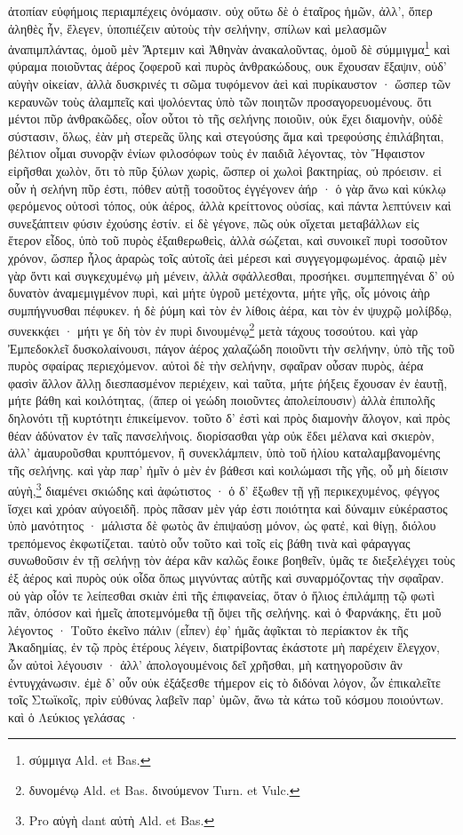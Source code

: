 \documentclass[a4paper, 11pt, oneside, polutonikogreek, german]{article}
\begin{document}
ἀτοπίαν εὐφήμοις περιαμπέχεις ὀνόμασιν. οὐχ οὕτω δὲ ὁ ἑταῖρος ἡμῶν, ἀλλ', ὅπερ ἀληθὲς ἦν, ἔλεγεν, ὑποπιέζειν αὐτοὺς τὴν σελήνην, σπίλων καὶ μελασμῶν ἀναπιμπλάντας, ὁμοῦ μὲν Ἄρτεμιν καὶ Ἀθηνὰν ἀνακαλοῦντας, ὁμοῦ δὲ σύμμιγμα\footnote{σύμμιγα Ald. et Bas.} καὶ φύραμα ποιοῦντας ἀέρος ζοφεροῦ καὶ πυρὸς ἀνθρακώδους, ουκ ἔχουσαν ἔξαψιν, οὐδ' αὐγὴν οἰκείαν, ἀλλὰ δυσκρινές τι σῶμα τυφόμενον ἀεὶ καὶ πυρίκαυστον · ὥσπερ τῶν κεραυνῶν τοὺς ἀλαμπεῖς καὶ ψολόεντας ὑπὸ τῶν ποιητῶν προσαγορευομένους. ὅτι μέντοι πῦρ ἀνθρακῶδες, οἷον οὗτοι τὸ τῆς σελήνης ποιοῦιν, οὐκ ἔχει διαμονὴν, οὐδὲ σύστασιν, ὅλως, ἐὰν μὴ στερεᾶς ὕλης καὶ στεγούσης ἅμα καὶ τρεφούσης ἐπιλάβηται, βέλτιον οἶμαι συνορᾷν ἐνίων φιλοσόφων τοὺς ἐν παιδιᾶ λέγοντας, τὸν Ἥφαιστον εἰρῆσθαι χωλὸν, ὅτι τὸ πῦρ ξύλων χωρὶς, ὥσπερ οἱ χωλοὶ βακτηρίας, οὐ πρόεισιν. εἰ οὖν ἡ σελήνη πῦρ ἐστι, πόθεν αὐτῇ τοσοῦτος ἐγγέγονεν ἀήρ · ὁ γὰρ ἄνω καὶ κύκλῳ φερόμενος οὑτοσὶ τόπος, οὐκ ἀέρος, ἀλλὰ κρείττονος οὐσίας, καὶ πάντα λεπτύνειν καὶ συνεξάπτειν φύσιν ἐχούσης ἐστίν. εἰ δὲ γέγονε, πῶς οὐκ οἴχεται μεταβάλλων εἰς ἕτερον εἶδος, ὑπὸ τοῦ πυρὸς ἐξαιθερωθεὶς, ἀλλὰ σώζεται, καὶ συνοικεῖ πυρὶ τοσοῦτον χρόνον, ὥσπερ ἧλος ἀραρὼς τοῖς αὐτοῖς ἀεὶ μέρεσι καὶ συγγεγομφωμένος. ἀραιῷ μὲν γὰρ ὄντι καὶ συγκεχυμένῳ μὴ μένειν, ἀλλὰ σφάλλεσθαι, προσήκει. συμπεπηγέναι δ' οὐ δυνατὸν ἀναμεμιγμένον πυρὶ, καὶ μήτε ὑγροῦ μετέχοντα, μήτε γῆς, οἷς μόνοις ἀὴρ συμπήγνυσθαι πέφυκεν. ἡ δὲ ῥύμη καὶ τὸν ἐν λίθοις ἀέρα, και τὸν ἐν ψυχρῷ μολίβδῳ, συνεκκᾴει · μήτι γε δὴ τὸν ἐν πυρὶ δινουμένῳ\footnote{δυνομένῳ Ald. et Bas. δινούμενον Turn. et Vulc.} μετὰ τάχους τοσούτου. καὶ γὰρ Ἐμπεδοκλεῖ δυσκολαίνουσι, πάγον ἀέρος χαλαζώδη ποιοῦντι τὴν σελήνην, ὑπὸ τῆς τοῦ πυρὸς σφαίρας περιεχόμενον. αὐτοὶ δὲ τὴν σελήνην, σφαῖραν οὖσαν πυρὸς, ἀέρα φασὶν ἄλλον ἄλλῃ διεσπασμένον περιέχειν, καὶ ταῦτα, μήτε ῥήξεις ἔχουσαν ἐν ἑαυτῇ, μήτε βάθη καὶ κοιλότητας, (ἅπερ οἱ γεώδη ποιοῦντες ἀπολείπουσιν) ἀλλὰ ἐπιπολῆς δηλονότι τῇ κυρτότητι ἐπικείμενον. τοῦτο δ' ἐστὶ καὶ πρὸς διαμονὴν ἄλογον, καὶ πρὸς θέαν ἀδύνατον ἐν ταῖς πανσελήνοις. διορίσασθαι γὰρ οὐκ ἔδει μέλανα καὶ σκιερὸν, ἀλλ' ἀμαυροῦσθαι κρυπτόμενον, ἢ συνεκλάμπειν, ὑπὸ τοῦ ἡλίου καταλαμβανομένης τῆς σελήνης. καὶ γὰρ παρ' ἡμῖν ὁ μὲν ἐν βάθεσι καὶ κοιλώμασι τῆς γῆς, οὗ μὴ δίεισιν αὐγὴ,\footnote{Pro αὐγὴ dant αὐτὴ Ald. et Bas.} διαμένει σκιώδης καὶ ἀφώτιστος · ὁ δ' ἔξωθεν τῇ γῇ περικεχυμένος, φέγγος ἴσχει καὶ χρόαν αὐγοειδῆ. πρὸς πᾶσαν μὲν γάρ ἐστι ποιότητα καὶ δύναμιν εὐκέραστος ὑπὸ μανότητος · μάλιστα δὲ φωτὸς ἂν ἐπιψαύσῃ μόνον, ὡς φατἐ, καὶ θίγῃ, διόλου τρεπόμενος ἐκφωτίζεται. ταὐτὸ οὖν τοῦτο καὶ τοῖς εἰς βάθη τινὰ καὶ φάραγγας συνωθοῦσιν ἐν τῇ σελήνῃ τὸν ἀέρα κἂν καλῶς ἔοικε βοηθεῖν, ὑμᾶς τε διεξελέγχει τοὺς ἐξ ἀέρος καὶ πυρὸς ούκ οἶδα ὅπως μιγνύντας αὐτῆς καὶ συναρμόζοντας τὴν σφαῖραν. οὐ γὰρ οἷόν τε λείπεσθαι σκιὰν ἐπὶ τῆς ἐπιφανείας, ὅταν ὁ ἥλιος ἐπιλάμπῃ τῷ φωτὶ πᾶν, ὁπόσον καὶ ἡμεῖς ἀποτεμνόμεθα τῇ ὄψει τῆς σελήνης. καὶ ὁ Φαρνάκης, ἔτι μοῦ λέγοντος · Τοῦτο ἐκεῖνο πάλιν (εἶπεν) ἐφ' ἡμᾶς ἀφῖκται τὸ περίακτον ἐκ τῆς Ἀκαδημίας, ἐν τῷ πρὸς ἑτέρους λέγειν, διατρίβοντας ἑκάστοτε μὴ παρέχειν ἔλεγχον, ὧν αὐτοὶ λέγουσιν · ἀλλ' ἀπολογουμένοις δεῖ χρῆσθαι, μὴ κατηγοροῦσιν ἂν ἐντυγχάνωσιν. ἐμὲ δ' οὖν οὐκ ἐξάξεσθε τήμερον εἰς τὸ διδόναι λόγον, ὧν ἐπικαλεῖτε τοῖς Στωϊκοῖς, πρὶν εὐθύνας λαβεῖν παρ' ὑμῶν, ἄνω τὰ κάτω τοῦ κόσμου ποιούντων. καὶ ὁ Λεύκιος γελάσας · 
\end{document}
